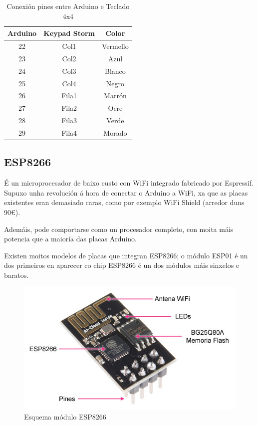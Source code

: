 \documentclass[11pt,twoside]{book}
\begin{document}
\begin{table}[H]
\begin{center}
\begin{tabular}{|c|c|c|}
\hline
Arduino & Keypad Storm & Color \\
\hline
22 & Col1 & Vermello \\
\hline
23 & Col2 & Azul\\
\hline
24 & Col3 & Blanco \\
\hline
25 & Col4 & Negro \\
\hline
26 & Fila1 & Marrón \\
\hline
27 & Fila2 & Ocre\\
\hline
28 & Fila3 & Verde \\
\hline
29 & Fila4 & Morado \\
\hline
\end{tabular}
\caption{Conexión pines entre Arduino e Teclado 4x4}
\label{TablaArduinoKeypad}
\end{center}
\end{table}

\subsection{ESP8266}

É un microprocesador de baixo custo con WiFi integrado fabricado por Espressif. Supuxo unha revolución á hora de conectar o Arduino a WiFi, xa que as placas existentes eran demasiado caras, como por exemplo WiFi Shield (arredor duns 90€).

Ademáis, pode comportarse como un procesador completo, con moita máis potencia que a maioría das placas Arduino.

Existen moitos modelos de placas que integran ESP8266; o módulo ESP01 é un dos primeiros en aparecer co chip ESP8266 é un dos módulos máis sinxelos e baratos.

\begin{figure}[H]
	\begin{center}
		\includegraphics[width=12cm]{images/esp8266_conexion.jpg}
	\end{center}
	\caption{Esquema módulo ESP8266}
	\label{fig:EsquemaESP8266}
\end{figure}
\end{document}
